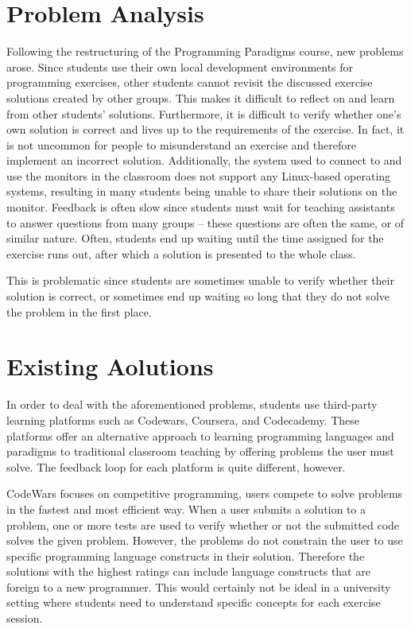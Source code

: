 \section{Problem Analysis}
Following the restructuring of the Programming Paradigms course, new problems arose.
Since students use their own local development environments for programming exercises, other students cannot revisit the discussed exercise solutions created by other groups.
This makes it difficult to reflect on and learn from other students' solutions.
Furthermore, it is difficult to verify whether one's own solution is correct and lives up to the requirements of the exercise.
In fact, it is not uncommon for people to misunderstand an exercise and therefore implement an incorrect solution.
Additionally, the system used to connect to and use the monitors in the classroom does not support any Linux-based operating systems, resulting in many students being unable to share their solutions on the monitor.
Feedback is often slow since students must wait for teaching assistants to answer questions from many groups -- these questions are often the same, or of similar nature.
Often, students end up waiting until the time assigned for the exercise runs out, after which a solution is presented to the whole class.

This is problematic since students are sometimes unable to verify whether their solution is correct, or sometimes end up waiting so long that they do not solve the problem in the first place.

\section{Existing Aolutions}
In order to deal with the aforementioned problems, students use third-party learning platforms such as Codewars\cite{Codewars}, Coursera\cite{Coursera}, and Codecademy\cite{Codecademy}.
These platforms offer an alternative approach to learning programming languages and paradigms to traditional classroom teaching by offering problems the user must solve.
The feedback loop for each platform is quite different, however.


CodeWars focuses on competitive programming, users compete to solve problems in the fastest and most efficient way.
When a user submits a solution to a problem, one or more tests are used to verify whether or not the submitted code solves the given problem.
However, the problems do not constrain the user to use specific programming language constructs in their solution.
Therefore the solutions with the highest ratings can include language constructs that are foreign to a new programmer.
This would certainly not be ideal in a university setting where students need to understand specific concepts for each exercise session.


